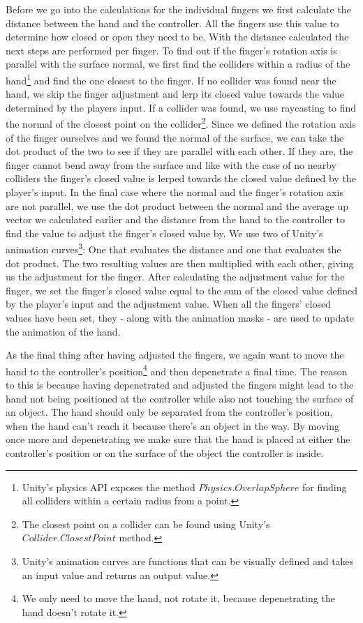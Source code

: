 Before we go into the calculations for the individual fingers we first calculate the distance between the hand and the controller. All the fingers use this value to determine how closed or open they need to be. With the distance calculated the next steps are performed per finger. To find out if the finger's rotation axis is parallel with the surface normal, we first find the colliders within a radius of the hand\footnote{Unity's physics API exposes the method $Physics.OverlapSphere$ for finding all colliders within a certain radius from a point.} and find the one closest to the finger. If no collider was found near the hand, we skip the finger adjustment and lerp its closed value towards the value determined by the players input. If a collider was found, we use raycasting to find the normal of the closest point on the collider\footnote{The closest point on a collider can be found using Unity's $Collider.ClosestPoint$ method.}. Since we defined the rotation axis of the finger ourselves and we found the normal of the surface, we can take the dot product of the two to see if they are parallel with each other. If they are, the finger cannot bend away from the surface and like with the case of no nearby colliders the finger's closed value is lerped towards the closed value defined by the player's input. In the final case where the normal and the finger's rotation axis are not parallel, we use the dot product between the normal and the average up vector we calculated earlier and the distance from the hand to the controller to find the value to adjust the finger's closed value by. We use two of Unity's animation curves\footnote{Unity's animation curves are functions that can be visually defined and takes an input value and returns an output value.}: One that evaluates the distance and one that evaluates the dot product. The two resulting values are then multiplied with each other, giving us the adjustment for the finger. After calculating the adjustment value for the finger, we set the finger's closed value equal to the sum of the closed value defined by the player's input and the adjustment value. When all the fingers' closed values have been set, they - along with the animation masks - are used to update the animation of the hand.

As the final thing after having adjusted the fingers, we again want to move the hand to the controller's position\footnote{We only need to move the hand, not rotate it, because depenetrating the hand doesn't rotate it.} and then depenetrate a final time. The reason to this is because having depenetrated and adjusted the fingers might lead to the hand not being positioned at the controller while also not touching the surface of an object. The hand should only be separated from the controller's position, when the hand can't reach it because there's an object in the way. By moving once more and depenetrating we make sure that the hand is placed at either the controller's position or on the surface of the object the controller is inside.

